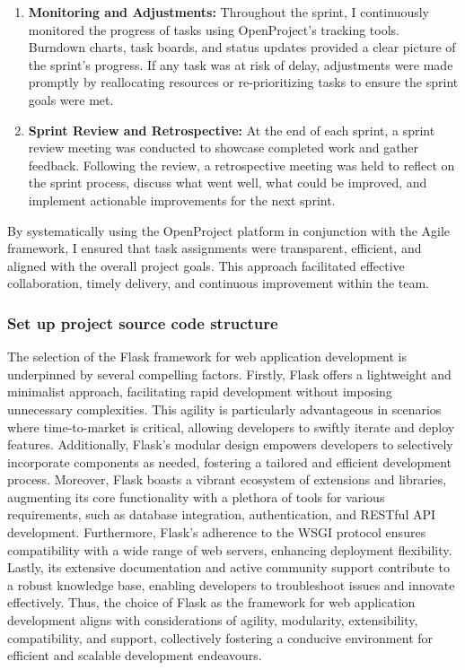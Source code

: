 \begin{enumerate}
            \item  \textbf{Monitoring and Adjustments: } Throughout the sprint, I continuously monitored the progress of tasks using OpenProject’s tracking tools. Burndown charts, task boards, and status updates provided a clear picture of the sprint’s progress. If any task was at risk of delay, adjustments were made promptly by reallocating resources or re-prioritizing tasks to ensure the sprint goals were met.

            \item \textbf{Sprint Review and Retrospective:} At the end of each sprint, a sprint review meeting was conducted to showcase completed work and gather feedback. Following the review, a retrospective meeting was held to reflect on the sprint process, discuss what went well, what could be improved, and implement actionable improvements for the next sprint. 
        \end{enumerate}

        By systematically using the OpenProject platform in conjunction with the Agile framework, I ensured that task assignments were transparent, efficient, and aligned with the overall project goals. This approach facilitated effective collaboration, timely delivery, and continuous improvement within the team.

    \subsubsection{Set up project source code structure}
     The selection of the Flask framework for web application development is underpinned by several compelling factors. Firstly, Flask offers a lightweight and minimalist approach, facilitating rapid development without imposing unnecessary complexities. This agility is particularly advantageous in scenarios where time-to-market is critical, allowing developers to swiftly iterate and deploy features. Additionally, Flask's modular design empowers developers to selectively incorporate components as needed, fostering a tailored and efficient development process. Moreover, Flask boasts a vibrant ecosystem of extensions and libraries, augmenting its core functionality with a plethora of tools for various requirements, such as database integration, authentication, and RESTful API development. Furthermore, Flask's adherence to the WSGI protocol ensures compatibility with a wide range of web servers, enhancing deployment flexibility. Lastly, its extensive documentation and active community support contribute to a robust knowledge base, enabling developers to troubleshoot issues and innovate effectively. Thus, the choice of Flask as the framework for web application development aligns with considerations of agility, modularity, extensibility, compatibility, and support, collectively fostering a conducive environment for efficient and scalable development endeavours. \\
    
